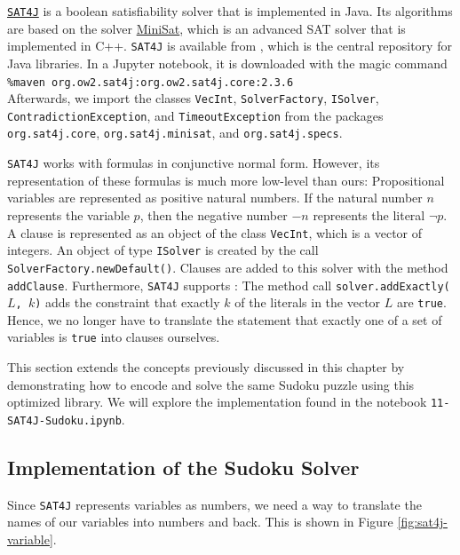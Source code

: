 \href{https://www.sat4j.org}{\texttt{SAT4J}} is a boolean satisfiability solver that is implemented in Java.
Its algorithms are based on the solver \href{http://minisat.se/}{MiniSat}, which is an advanced SAT solver that
is implemented in C++.  \texttt{SAT4J} is available from , which is the central repository
for Java libraries.  In a Jupyter notebook, it is downloaded with the magic command
\\[0.2cm]
\hspace*{1.3cm}
\texttt{\%maven org.ow2.sat4j:org.ow2.sat4j.core:2.3.6}
\\[0.2cm]
Afterwards, we import the classes \texttt{VecInt}, \texttt{SolverFactory}, \texttt{ISolver},
\texttt{ContradictionException}, and \texttt{TimeoutException} from the packages \texttt{org.sat4j.core},
\texttt{org.sat4j.minisat}, and \texttt{org.sat4j.specs}.

\texttt{SAT4J} works with formulas in conjunctive normal form.  However, its representation of
these formulas is much more low-level than ours:  Propositional variables are represented as positive natural
numbers.  If the natural number $n$ represents the variable $p$, then the negative number $-n$ represents the
literal $\neg p$.  A clause is represented as an object of the class \texttt{VecInt}, which is a vector of
integers.  An object of type \texttt{ISolver} is created by the call \texttt{SolverFactory.newDefault()}.
Clauses are added to this solver with the method \texttt{addClause}.  Furthermore, \texttt{SAT4J} supports
:  The method call \texttt{solver.addExactly($L$, $k$)} adds the constraint that
exactly $k$ of the literals in the vector $L$ are \texttt{true}.  Hence, we no longer have to translate the
statement that exactly one of a set of variables is \texttt{true} into clauses ourselves.

This section extends the concepts previously discussed in this chapter by demonstrating how
to encode and solve the same Sudoku puzzle using this optimized library. We will explore the implementation
found in the notebook \texttt{11-SAT4J-Sudoku.ipynb}. 

\subsection{Implementation of the Sudoku Solver}
Since \texttt{SAT4J} represents variables as numbers, we need a way to translate the names of our variables
into numbers and back.  This is shown in Figure \ref{fig:sat4j-variable}.

